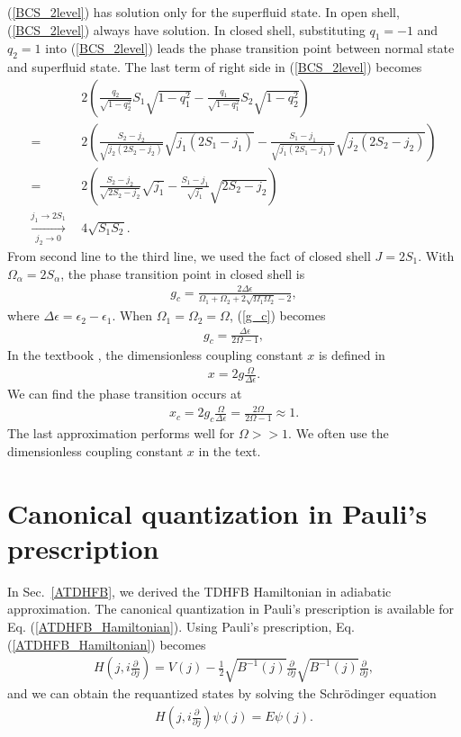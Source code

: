 \documentclass[11pt]{book} %
\begin{document}
(\ref{BCS_2level}) has solution only for the superfluid state. In open shell, (\ref{BCS_2level}) always have solution. In closed shell, substituting $q_1=-1$ and $q_2=1$ into (\ref{BCS_2level}) leads the phase transition point between normal state and superfluid state. The last term of right side in (\ref{BCS_2level}) becomes
\begin{align*}
	& 2\left(\frac{q_2}{\sqrt{1-q_2^2}}S_1\sqrt{1-q_1^2}
	-\frac{q_1}{\sqrt{1-q_1^2}}S_2\sqrt{1-q_2^2}\right) \\
	=\ \ & 2\left(\frac{S_2-j_2}{\sqrt{j_2(2S_2-j_2)}}\sqrt{j_1(2S_1-j_1)}
	- \frac{S_1-j_1}{\sqrt{j_1(2S_1-j_1)}}\sqrt{j_2(2S_2-j_2)}\right) \\
	=\ \ & 2\left(\frac{S_2-j_2}{\sqrt{2S_2-j_2}}\sqrt{j_1}
	- \frac{S_1-j_1}{\sqrt{j_1}}\sqrt{2S_2-j_2}\right) \\ 
	\xrightarrow[j_2\to0]{j_1\to2S_1}\ \ &  4 \sqrt{S_1S_2} .
\end{align*}
From second line to the third line, we used the fact of closed shell $J=2S_1$. With $\Omega_{\alpha}=2S_{\alpha}$, the phase transition point in closed shell is
\begin{align}
	g_c = \frac{2\Delta\epsilon}{\Omega_1+\Omega_2+2\sqrt{\Omega_1\Omega_2}-2} ,
	\label{g_c}
\end{align}
where $\Delta\epsilon=\epsilon_2-\epsilon_1$. When $\Omega_1=\Omega_2=\Omega$, (\ref{g_c}) becomes
\begin{align}
	g_c = \frac{\Delta\epsilon}{2\Omega-1} ,
	\label{g_2}
\end{align}
In the textbook \cite{}, the dimensionless coupling constant $x$ is defined in
\begin{align}
	x = 2g \frac{\Omega}{\Delta\epsilon} .
	\label{x}
\end{align}
We can find the phase transition occurs at
\begin{align}
	x_c = 2g_c \frac{\Omega}{\Delta\epsilon} = \frac{2\Omega}{2\Omega-1} \approx 1.
	\label{x_c}
\end{align}
The last approximation performs well for $\Omega>>1$. We often use the dimensionless coupling constant $x$ in the text. 

\section{Canonical quantization in Pauli's prescription}
\label{can-trans}

In Sec.~\ref{ATDHFB}, we derived the TDHFB Hamiltonian in adiabatic approximation. 
The canonical quantization in Pauli's prescription is available for Eq. (\ref{ATDHFB_Hamiltonian}). Using Pauli's prescription, Eq. (\ref{ATDHFB_Hamiltonian}) becomes
\begin{align}
   H \left( j,i\frac{\partial}{\partial j} \right) = V(j) - \frac{1}{2}\sqrt{B^{-1}(j)}\frac{\partial}{\partial j}\sqrt{B^{-1}(j)}\frac{\partial}{\partial j},
\label{Pauli}
\end{align}
and we can obtain the requantized states by solving the Schr\"{o}dinger equation
\begin{align}
   H \left( j,i\frac{\partial}{\partial j} \right) \psi(j) = E \psi(j).
\end{align}
\end{document}
